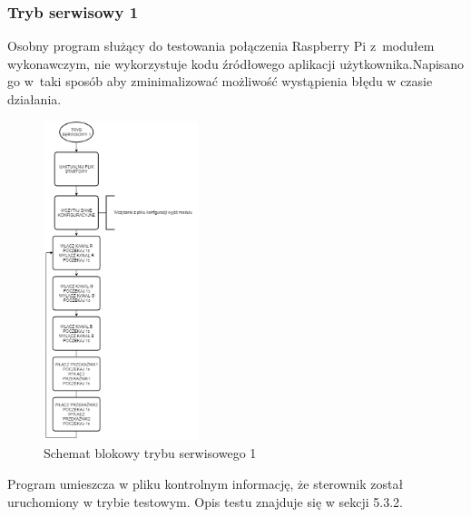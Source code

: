 \documentclass[12pt, eng, twoside, openany, final]{mgr}
\begin{document}
                    \subsubsection{Tryb serwisowy 1}
                    Osobny program służący do testowania połączenia Raspberry Pi z~modułem wykonawczym, nie wykorzystuje kodu źródłowego aplikacji użytkownika.Napisano go w~taki sposób aby zminimalizować możliwość wystąpienia błędu w czasie działania.
                        \begin{figure}[H]
                        \begin{center}
                            \includegraphics[width=0.4\textwidth]{t1.png}
                            \caption{Schemat blokowy trybu serwisowego 1} \label{fig:serT1}
                        \end{center}
                        \end{figure}
                        \noindent Program umieszcza w pliku kontrolnym informację, że sterownik został uruchomiony w trybie testowym. Opis testu znajduje się w sekcji 5.3.2. 

                        \newpage
                    
\end{document}
